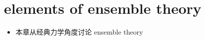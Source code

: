 \chapter{elements of ensemble theory}
\begin{itemize}
	\item 本章从经典力学角度讨论 ensemble theory
\end{itemize}

